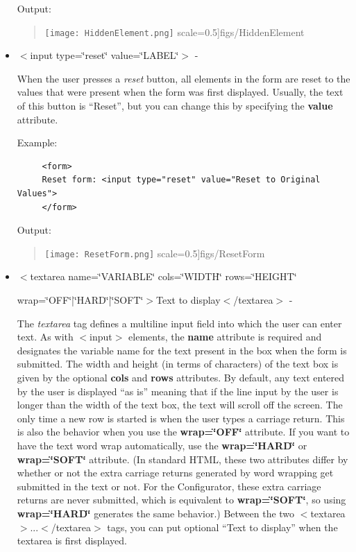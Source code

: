 \begin{itemize}
Output: 

\begin{quote}
\texttt{[image: HiddenElement.png]}
  scale=0.5]{figs/HiddenElement}
\end{quote}
\item $<$input type=\char`\"{}reset\char`\"{}
value=\char`\"{}LABEL\char`\"{}$>$
- 


When the user presses a \textit{reset} button, all elements in the
form are reset to the values that were present when the form was first
displayed. Usually, the text of this button is {}``Reset'', but
you can change this by specifying the \textbf{value} attribute.

Example:

\begin{footnotesize}
\begin{verbatim}
     <form> 
     Reset form: <input type="reset" value="Reset to Original Values">
     </form>
\end{verbatim}
\end{footnotesize}

Output: 

\begin{quote}
\texttt{[image: ResetForm.png]}
  scale=0.5]{figs/ResetForm}
\end{quote}
\item $<$textarea name=\char`\"{}VARIABLE\char`\"{} cols=\char`\"{}WIDTH\char`\"{}
rows=\char`\"{}HEIGHT\char`\"{} 


wrap=\char`\"{}OFF\char`\"{}|\char`\"{}HARD\char`\"{}|\char`\"{}SOFT\char`\"{}$>$Text
to display$<$/textarea$>$ - 

The \textit{textarea} tag defines a multiline input field into which
the user can enter text. As with $<$input$>$ elements, the \textbf{name}
attribute is required and designates the variable name for the text
present in the box when the form is submitted. The width and height
(in terms of characters) of the text box is given by the optional
\textbf{cols} and \textbf{rows} attributes. By default, any text entered
by the user is displayed {}``as is'' meaning that if the line input
by the user is longer than the width of the text box, the text will
scroll off the screen. The only time a new row is started is when
the user types a carriage return. This is also the behavior when you
use the \textbf{wrap=\char`\"{}OFF\char`\"{}} attribute. If you want
to have the text word wrap automatically, use the \textbf{wrap=\char`\"{}HARD\char`\"{}}
or \textbf{wrap=\char`\"{}SOFT\char`\"{}} attribute. (In standard
HTML, these two attributes differ by whether or not the extra carriage
returns generated by word wrapping get submitted in the text or not.
For the Configurator, these extra carriage returns are never submitted,
which is equivalent to \textbf{wrap=\char`\"{}SOFT\char`\"{}}, so
using \textbf{wrap=\char`\"{}HARD\char`\"{}} generates the same behavior.)
Between the two $<$textarea$>$...$<$/textarea$>$ tags, you can put optional
{}``Text to display'' when the textarea is first displayed.


\end{itemize}
